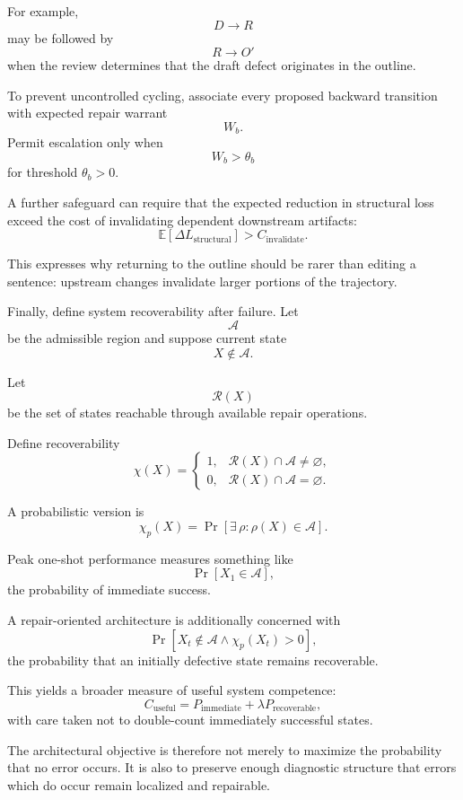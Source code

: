 \documentclass[11pt]{article}
\begin{document}
For example,
\[
    D\rightarrow R
\]
may be followed by
\[
    R\rightarrow O'
\]
when the review determines that the draft defect originates in the outline.

To prevent uncontrolled cycling, associate every proposed backward transition with expected repair warrant
\[
    W_b.
\]
Permit escalation only when
\[
    W_b>\theta_b
\]
for threshold \(\theta_b>0\).

A further safeguard can require that the expected reduction in structural loss exceed the cost of invalidating dependent downstream artifacts:
\[
    \mathbb{E}[\Delta L_{\mathrm{structural}}]
    >
    C_{\mathrm{invalidate}}.
\]

This expresses why returning to the outline should be rarer than editing a sentence: upstream changes invalidate larger portions of the trajectory.

Finally, define system recoverability after failure. Let
\[
    \mathcal{A}
\]
be the admissible region and suppose current state
\[
    X\notin\mathcal{A}.
\]

Let
\[
    \mathcal{R}(X)
\]
be the set of states reachable through available repair operations.

Define recoverability
\[
    \chi(X)
    =
    \begin{cases}
    1,
    &
    \mathcal{R}(X)\cap\mathcal{A}\neq\varnothing,
    \\
    0,
    &
    \mathcal{R}(X)\cap\mathcal{A}=\varnothing.
    \end{cases}
\]

A probabilistic version is
\[
    \chi_p(X)
    =
    \Pr
    \left[
        \exists\,\rho:
        \rho(X)\in\mathcal{A}
    \right].
\]

Peak one-shot performance measures something like
\[
    \Pr[X_1\in\mathcal{A}],
\]
the probability of immediate success.

A repair-oriented architecture is additionally concerned with
\[
    \Pr
    \left[
        X_t\notin\mathcal{A}
        \land
        \chi_p(X_t)>0
    \right],
\]
the probability that an initially defective state remains recoverable.

This yields a broader measure of useful system competence:
\[
    C_{\mathrm{useful}}
    =
    P_{\mathrm{immediate}}
    +
    \lambda
    P_{\mathrm{recoverable}},
\]
with care taken not to double-count immediately successful states.

The architectural objective is therefore not merely to maximize the probability that no error occurs. It is also to preserve enough diagnostic structure that errors which do occur remain localized and repairable.
\end{document}
